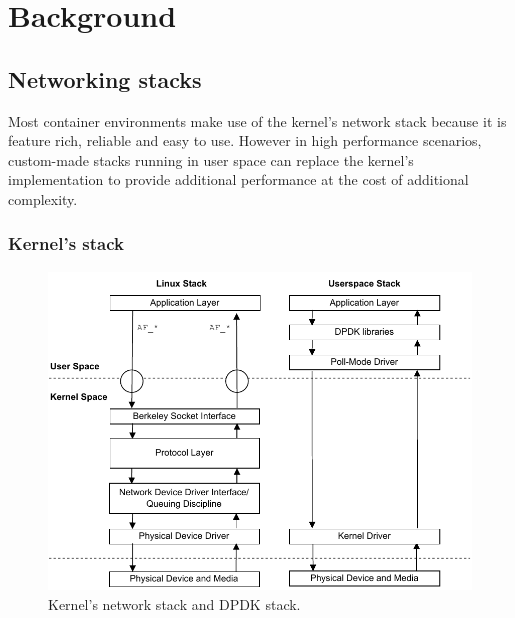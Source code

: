 \documentclass[conference]{IEEEtran}
\begin{document}
\section{Background}
\subsection{Networking stacks}
Most container environments make use of the kernel's network stack because it is feature rich, reliable and easy to use. However in high performance scenarios, custom-made stacks running in user space can replace the kernel's implementation to provide additional performance at the cost of additional complexity.  
\subsubsection{Kernel's stack}
\begin{figure}[!t]
\centering
\includegraphics[scale=0.6]{kernel_stack.pdf}
\caption{Kernel's network stack \cite{kernel_stack} and DPDK stack.}
\label{kernel_stack}
\end{figure}
\end{document}
